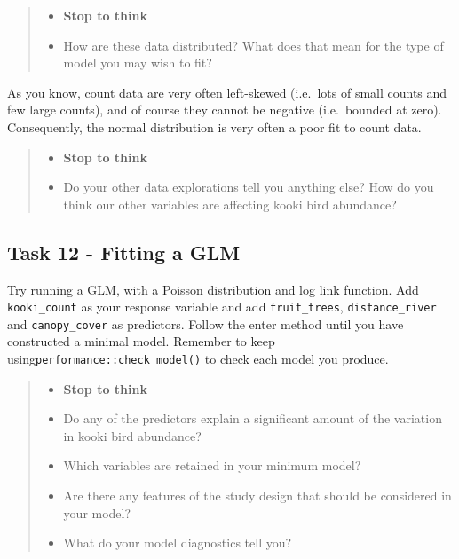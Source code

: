 \documentclass[
]{book}
\providecommand{\tightlist}{%
  \setlength{\itemsep}{0pt}\setlength{\parskip}{0pt}}
\begin{document}
\begin{quote}
\begin{itemize}
\tightlist
\item
  \textbf{Stop to think}
\item
  How are these data distributed? What does that mean for the type of model you may wish to fit?
\end{itemize}
\end{quote}

As you know, count data are very often left-skewed (i.e.~lots of small counts and few large counts), and of course they cannot be negative (i.e.~bounded at zero). Consequently, the normal distribution is very often a poor fit to count data.

\begin{quote}
\begin{itemize}
\tightlist
\item
  \textbf{Stop to think}
\item
  Do your other data explorations tell you anything else? How do you think our other variables are affecting kooki bird abundance?
\end{itemize}
\end{quote}

\subsection{Task 12 - Fitting a GLM}\label{task-12---fitting-a-glm}

Try running a GLM, with a Poisson distribution and log link function. Add \texttt{kooki\_count} as your response variable and add \texttt{fruit\_trees}, \texttt{distance\_river} and \texttt{canopy\_cover} as predictors. Follow the enter method until you have constructed a minimal model. Remember to keep using\texttt{performance::check\_model()} to check each model you produce.

\begin{quote}
\begin{itemize}
\tightlist
\item
  \textbf{Stop to think}
\item
  Do any of the predictors explain a significant amount of the variation in kooki bird abundance?
\item
  Which variables are retained in your minimum model?
\item
  Are there any features of the study design that should be considered in your model?
\item
  What do your model diagnostics tell you?
\end{itemize}
\end{quote}
\end{document}
